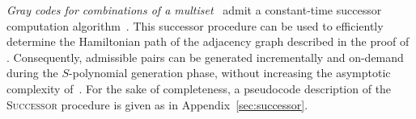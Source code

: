 

\emph{Gray codes for combinations of a multiset}~\cite{DBLP:journals/ejc/RuskeyS96} admit a constant-time successor computation algorithm~\cite{DBLP:journals/cj/Takaoka99,DBLP:journals/corr/Takaoka15a}. This successor procedure can be used to efficiently determine the Hamiltonian path of the adjacency graph described in the proof of . Consequently, admissible pairs can be generated incrementally and on-demand during the $S$-polynomial generation phase, without increasing the asymptotic complexity of~.
For the sake of completeness, a pseudocode description of the \textsc{Successor} procedure is given as  in Appendix~\ref{sec:successor}.










